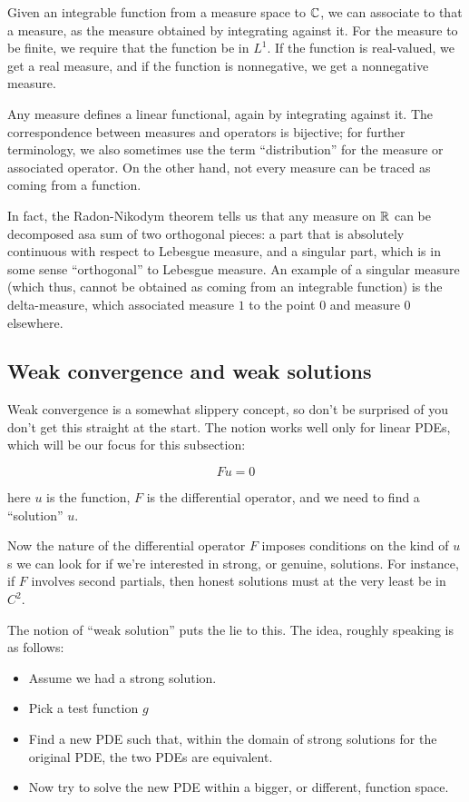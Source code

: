 \documentclass[a4paper]{amsart}
\begin{document}
Given an integrable function from a measure space to $\mathbb{C}$, we can
associate to that a measure, as the measure obtained by integrating
against it. For the measure to be finite, we require that the function
be in $L^1$. If the function is real-valued, we get a real measure,
and if the function is nonnegative, we get a nonnegative measure.

Any measure defines a linear functional, again by integrating against
it. The correspondence between measures and operators is bijective;
for further terminology, we also sometimes use the term
``distribution'' for the measure or associated operator. On the other
hand, not every measure can be traced as coming from a function.

In fact, the Radon-Nikodym theorem tells us that any measure on $\mathbb{R}$
can be decomposed asa sum of two orthogonal pieces: a part that is
absolutely continuous with respect to Lebesgue measure, and a singular
part, which is in some sense ``orthogonal'' to Lebesgue measure. An
example of a singular measure (which thus, cannot be obtained as
coming from an integrable function) is the delta-measure, which
associated measure $1$ to the point $0$ and measure $0$ elsewhere.

\subsection{Weak convergence and weak solutions}

Weak convergence is a somewhat slippery concept, so don't be surprised
of you don't get this straight at the start. The notion works well
only for linear PDEs, which will be our focus for this subsection:

$$Fu = 0$$

here $u$ is the function, $F$ is the differential operator, and we
need to find a ``solution'' $u$.

Now the nature of the differential operator $F$ imposes conditions on
the kind of $u$s we can look for if we're interested in strong, or
genuine, solutions. For instance, if $F$ involves second partials,
then honest solutions must at the very least be in $C^2$.

The notion of ``weak solution'' puts the lie to this. The idea,
roughly speaking is as follows:

\begin{itemize}

\item Assume we had a strong solution.

\item Pick a test function $g$

\item Find a new PDE such that, within the domain of strong solutions
  for the original PDE, the two PDEs are equivalent.

\item Now try to solve the new PDE within a bigger, or different,
  function space.

\end{itemize}
\end{document}
